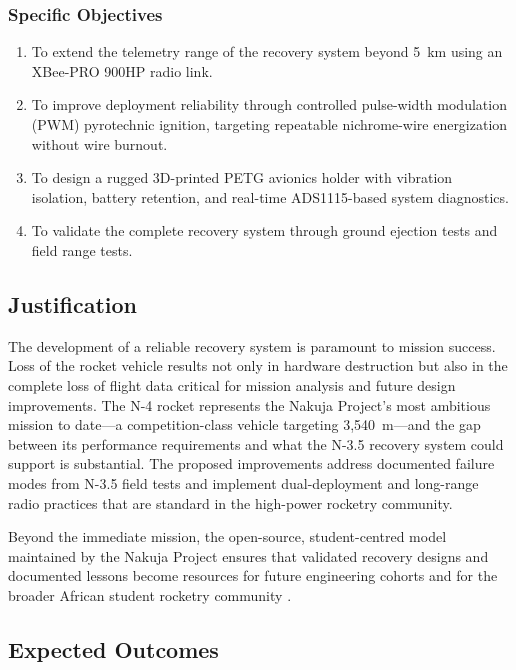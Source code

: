 \subsubsection{Specific Objectives}
\begin{enumerate}
    \item To extend the telemetry range of the recovery system beyond 5~km using an XBee-PRO 900HP radio link.
    \item To improve deployment reliability through controlled pulse-width modulation (PWM) pyrotechnic ignition, targeting repeatable nichrome-wire energization without wire burnout.
    \item To design a rugged 3D-printed PETG avionics holder with vibration isolation, battery retention, and real-time ADS1115-based system diagnostics.
    \item To validate the complete recovery system through ground ejection tests and field range tests.
\end{enumerate}

\subsection{Justification}

The development of a reliable recovery system is paramount to mission success. Loss of the rocket vehicle results not only in hardware destruction but also in the complete loss of flight data critical for mission analysis and future design improvements. The N-4 rocket represents the Nakuja Project's most ambitious mission to date---a competition-class vehicle targeting 3,540~m---and the gap between its performance requirements and what the N-3.5 recovery system could support is substantial. The proposed improvements address documented failure modes from N-3.5 field tests and implement dual-deployment and long-range radio practices that are standard in the high-power rocketry community.

Beyond the immediate mission, the open-source, student-centred model maintained by the Nakuja Project ensures that validated recovery designs and documented lessons become resources for future engineering cohorts and for the broader African student rocketry community \cite{nakuja_website}.

\subsection{Expected Outcomes}

